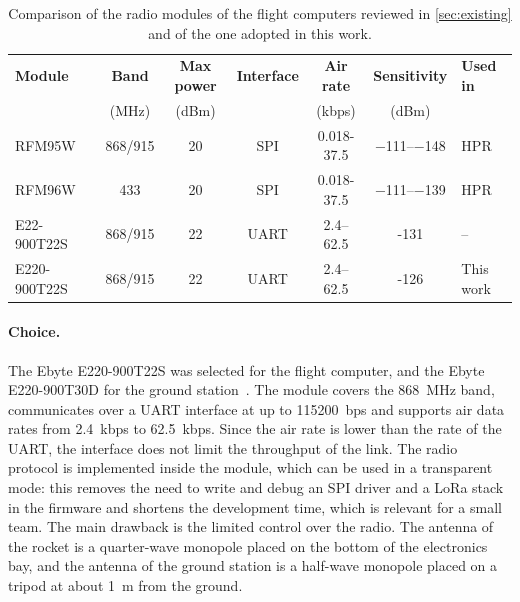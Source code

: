 \begin{table}[htb]
    \centering
    \small
    \setlength{\tabcolsep}{3pt}
    \caption{Comparison of the radio modules of the flight computers reviewed in \cref{sec:existing} and of the one adopted in this work.}
    \label{tab:radio-comparison}
    \begin{tabularx}{\textwidth}{@{}l c c c c c >{\raggedright\arraybackslash}X@{}}
        \toprule
        \textbf{Module} & \textbf{Band} & \textbf{Max power} & \textbf{Interface} & \textbf{Air rate} & \textbf{Sensitivity} & \textbf{Used in} \\
        & {\footnotesize (\unit{\mega\hertz})} & {\footnotesize (\unit{dBm})} & & {\footnotesize (\unit{kbps})} & {\footnotesize (\unit{dBm})} & \\
        \midrule
        RFM95W~\cite{rfm95w:datasheet} & 868/915 & 20 & SPI & 0.018-37.5 & \numrange{-111}{-148} & HPR \\
        RFM96W~\cite{rfm95w:datasheet} & 433 & 20 & SPI & 0.018-37.5 & \numrange{-111}{-139} & HPR \\
        E22-900T22S~\cite{e22:manual} & 868/915 & 22 & UART & 2.4--62.5 & -131 & -- \\
        E220-900T22S~\cite{e220:manual} & 868/915 & 22 & UART & 2.4--62.5 & -126 & This work \\
        \bottomrule
    \end{tabularx}
\end{table}

\paragraph{Choice.} The Ebyte E220-900T22S was selected for the flight computer, and the Ebyte E220-900T30D for the ground station~\cite{e220:manual}. The module covers the \SI{868}{MHz} band, communicates over a UART interface at up to \SI{115200}{bps} and supports air data rates from \SI{2.4}{kbps} to \SI{62.5}{kbps}. Since the air rate is lower than the rate of the UART, the interface does not limit the throughput of the link. The radio protocol is implemented inside the module, which can be used in a transparent mode: this removes the need to write and debug an SPI driver and a LoRa stack in the firmware and shortens the development time, which is relevant for a small team. The main drawback is the limited control over the radio. The antenna of the rocket is a quarter-wave monopole placed on the bottom of the electronics bay, and the antenna of the ground station is a half-wave monopole placed on a tripod at about \SI{1}{m} from the ground.